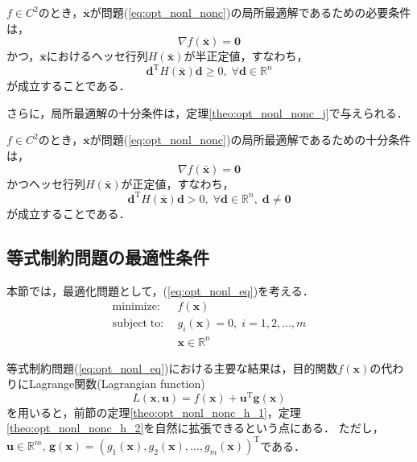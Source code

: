 \documentclass{jsreport}
\begin{document}
\begin{theo}\label{theo:opt_nonl_nonc_h_2}
  $f \in C^2$のとき，$\bar{\bm{x}}$が問題(\ref{eq:opt_nonl_nonc})の局所最適解であるための必要条件は，
  \begin{equation}
    \nabla f(\bar{\bm{x}}) = \bm{0} \nonumber
  \end{equation}
  かつ，$\bar{\bm{x}}$におけるヘッセ行列$H(\bar{\bm{x}})$が半正定値，すなわち，
  \begin{equation}
    \bm{d}^{\mathrm{T}} H(\bar{\bm{x}}) \bm{d} \geq 0, \; \forall \bm{d} \in \mathbb{R}^n \nonumber
  \end{equation}
  が成立することである．
\end{theo}

さらに，局所最適解の十分条件は，定理\ref{theo:opt_nonl_nonc_j}で与えられる．
\begin{theo}\label{theo:opt_nonl_nonc_j}
  $f \in C^2$のとき，$\bar{\bm{x}}$が問題(\ref{eq:opt_nonl_nonc})の局所最適解であるための十分条件は，
  \begin{equation}
    \nabla f(\bar{\bm{x}}) = \bm{0} \nonumber
  \end{equation}
  かつヘッセ行列$H(\bar{\bm{x}})$が正定値，すなわち，
  \begin{equation}
    \bm{d}^{\mathrm{T}} H(\bar{\bm{x}}) \bm{d} > 0, \; \forall \bm{d} \in \mathbb{R}^n, \; \bm{d} \neq \bm{0} \nonumber
  \end{equation}
  が成立することである．
\end{theo}

\subsection{等式制約問題の最適性条件}
本節では，最適化問題として，(\ref{eq:opt_nonl_eq})を考える．
\begin{align}\label{eq:opt_nonl_eq}
  \mathrm{minimize} : \; &f(\bm{x}) \nonumber\\
  \mathrm{subject \; to} : \; &g_i(\bm{x}) = 0, \; i = 1, 2, \ldots, m \nonumber \\
  &\bm{x} \in \mathbb{R}^n
\end{align}

等式制約問題(\ref{eq:opt_nonl_eq})における主要な結果は，目的関数$f(\bm{x})$の代わりにLagrange関数(Lagrangian function)
\begin{equation}\label{eq:lag}
  L(\bm{x}, \bm{u}) = f(\bm{x}) + \bm{u}^{\mathrm{T}} \bm{g}(\bm{x})
\end{equation}
を用いると，前節の定理\ref{theo:opt_nonl_nonc_h_1}，定理\ref{theo:opt_nonl_nonc_h_2}を自然に拡張できるという点にある．
ただし，$\bm{u} \in \mathbb{R}^m, \, \bm{g}(\bm{x}) = (g_1(\bm{x}), g_2(\bm{x}), \ldots, g_m(\bm{x}))^{\mathrm{T}}$である．
\end{document}

